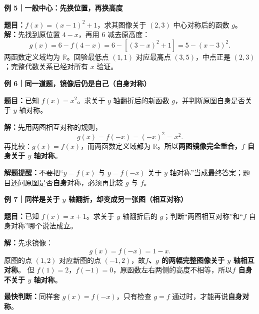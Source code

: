 \clearpage
\begin{examplebox}
\textbf{例 5｜一般中心：先换位置，再换高度}


\textbf{题目：}$f(x)=(x-1)^2+1$，求其图像关于 $(2,3)$ 中心对称后的函数 $g$。
\textbf{解：}先找到原位置 $4-x$，再用 $6$ 减去原高度：
\[g(x)=6-f(4-x)=6-[(3-x)^2+1]=5-(x-3)^2.\]
两函数定义域均为 $\mathbb R$。回验最低点 $(1,1)$ 对应最高点 $(3,5)$，中点正是 $(2,3)$；完整代数关系已经对所有 $x$ 验证。

\end{examplebox}


\clearpage
\begin{examplebox}
\textbf{例 6｜同一道题，镜像后仍是自己（自身对称）}
\begin{center}
\end{center}
\textbf{题目：}已知 $f(x)=x^2$。求关于 $y$ 轴翻折后的新函数 $g$，并判断原图自身是否关于 $y$ 轴对称。

\textbf{解：}先用两图相互对称的规则，
\[g(x)=f(-x)=(-x)^2=x^2.\]
再比较：$g(x)=f(x)$，而两函数定义域都为 $\mathbb R$。所以\textbf{两图镜像完全重合，$f$ 自身关于 $y$ 轴对称}。

\textbf{解题提醒：}不要把“$y=f(x)$ 与 $y=f(-x)$ 关于 $y$ 轴对称”当成最终答案；题目还问原图是否\textbf{自身}对称，必须再比较 $g$ 与 $f$。
\end{examplebox}
\clearpage
\begin{examplebox}
\textbf{例 7｜同样是关于 $y$ 轴翻折，却变成另一张图（相互对称）}
\begin{center}
\end{center}
\textbf{题目：}已知 $f(x)=x+1$。求关于 $y$ 轴翻折后的 $g$；判断“两图相互对称”和“$f$ 自身对称”哪个说法成立。

\textbf{解：}先求镜像：
\[g(x)=f(-x)=1-x.\]
原图的点 $(1,2)$ 对应新图的点 $(-1,2)$，故\textbf{$f$、$g$ 的两幅完整图像关于 $y$ 轴相互对称}。
但 $f(1)=2$，$f(-1)=0$，原函数左右两侧的高度不相等，所以\textbf{$f$ 自身不关于 $y$ 轴对称}。

\textbf{最快判断：}同样套 $g(x)=f(-x)$，只有检查 $g=f$ 通过时，才能再说\textbf{自身对称}。
\end{examplebox}


